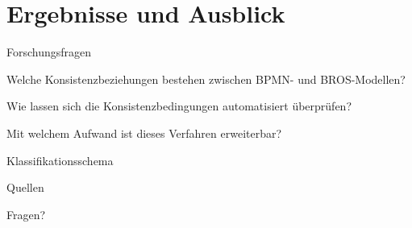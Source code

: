 \section{Ergebnisse und Ausblick}

\begin{frame}{Forschungsfragen}
  \begin{description}[4cm]
    \item[F1] Welche Konsistenzbeziehungen bestehen zwischen BPMN- und BROS-Modellen?

    \item[F2] Wie lassen sich die Konsistenzbedingungen automatisiert überprüfen?

    \item[F3] Mit welchem Aufwand ist dieses Verfahren erweiterbar?
  \end{description}
\end{frame}

\begin{frame}{Klassifikationsschema}
  
\end{frame}

\begin{frame}{Quellen}
  \printbibliography[heading=none]
\end{frame}

\begin{frame}[standout]
  Fragen?
\end{frame}
